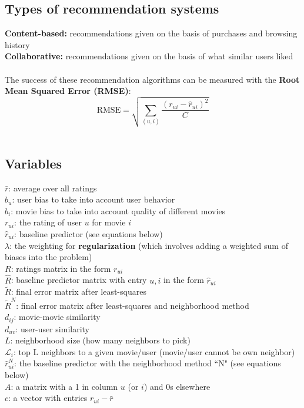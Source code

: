 \documentclass{article}
\newcommand{\MatrixVariable}[1]{\bm{\mathit{#1}}}
\begin{document}
\subsection{Types of recommendation systems}

\textbf{Content-based:} recommendations given on the basis of purchases and browsing history \\
\textbf{Collaborative:} recommendations given on the basis of what similar users liked \\
\\
The success of these recommendation algorithms can be measured with the \textbf{Root Mean Squared Error (RMSE)}: \\
$$\text{RMSE} = \sqrt{\sum_{(u,i)} \frac{(r_{ui} - \hat{r}_{ui})^2}{C}}$$ \\

\subsection{Variables}

$\bar{r}$: average over all ratings \\
$b_u$: user bias to take into account user behavior \\
$b_i$: movie bias to take into account quality of different movies \\
$r_{ui}$: the rating of user $u$ for movie $i$ \\
$\hat{r}_{ui}$: baseline predictor (see equations below) \\
$\lambda$: the weighting for \textbf{regularization} (which involves adding a weighted sum of biases into the problem) \\
$\MatrixVariable{R}$: ratings matrix in the form $r_{ui}$ \\
$\MatrixVariable{\hat{R}}$: baseline predictor matrix with entry $u,i$ in the form $\hat{r}_{ui}$ \\
$\MatrixVariable{\tilde{R}}$: final error matrix after least-squares \\
$\MatrixVariable{\tilde{R}^N}$: final error matrix after least-squares and neighborhood method \\
$d_{ij}$: movie-movie similarity \\
$d_{uv}$: user-user similarity \\
$L$: neighborhood size (how many neighbors to pick) \\
$\mathcal{L}_i$: top L neighbors to a given movie/user (movie/user cannot be own neighbor) \\
$\hat{r}_{ui}^N$: the baseline predictor with the neighborhood method ``N" (see equations below) \\
$\MatrixVariable{A}$: a matrix with a 1 in column $u$ (or $i$) and 0s elsewhere \\
$\MatrixVariable{c}$: a vector with entries $r_{ui} - \bar{r}$ \\
\end{document}
